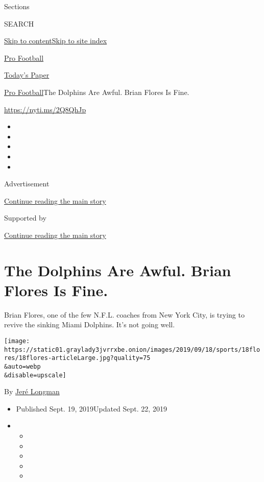 Sections

SEARCH

\protect\hyperlink{site-content}{Skip to
content}\protect\hyperlink{site-index}{Skip to site index}

\href{https://www.nytimes3xbfgragh.onion/section/sports/football}{Pro
Football}

\href{https://myaccount.nytimes3xbfgragh.onion/auth/login?response_type=cookie\&client_id=vi}{}

\href{https://www.nytimes3xbfgragh.onion/section/todayspaper}{Today's
Paper}

\href{/section/sports/football}{Pro Football}\textbar{}The Dolphins Are
Awful. Brian Flores Is Fine.

\url{https://nyti.ms/2Q8QhJp}

\begin{itemize}
\item
\item
\item
\item
\item
\end{itemize}

Advertisement

\protect\hyperlink{after-top}{Continue reading the main story}

Supported by

\protect\hyperlink{after-sponsor}{Continue reading the main story}

\hypertarget{the-dolphins-are-awful-brian-flores-is-fine}{%
\section{The Dolphins Are Awful. Brian Flores Is
Fine.}\label{the-dolphins-are-awful-brian-flores-is-fine}}

Brian Flores, one of the few N.F.L. coaches from New York City, is
trying to revive the sinking Miami Dolphins. It's not going well.

\texttt{[image: https://static01.graylady3jvrrxbe.onion/images/2019/09/18/sports/18flores/18flores-articleLarge.jpg?quality=75\\\&auto=webp\\\&disable=upscale]}

By \href{https://www.nytimes3xbfgragh.onion/by/jere-longman}{Jeré
Longman}

\begin{itemize}
\item
  Published Sept. 19, 2019Updated Sept. 22, 2019
\item
  \begin{itemize}
  \item
  \item
  \item
  \item
  \item
  \end{itemize}
\end{itemize}

